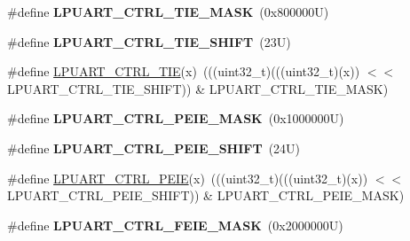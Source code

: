 \begin{DoxyCompactItemize}
\item 
\mbox{\label{group___l_p_u_a_r_t___register___masks_gac83549268480aabbbe8450d1f3986090}} 
\#define {\bfseries L\+P\+U\+A\+R\+T\+\_\+\+C\+T\+R\+L\+\_\+\+T\+I\+E\+\_\+\+M\+A\+SK}~(0x800000\+U)
\item 
\mbox{\label{group___l_p_u_a_r_t___register___masks_gab5a90d5ebd146e3cc70bcff71f23d8cc}} 
\#define {\bfseries L\+P\+U\+A\+R\+T\+\_\+\+C\+T\+R\+L\+\_\+\+T\+I\+E\+\_\+\+S\+H\+I\+FT}~(23\+U)
\item 
\#define \mbox{\hyperlink{group___l_p_u_a_r_t___register___masks_ga5b4e1b65b7d7dd995742fdf22b9a53a5}{L\+P\+U\+A\+R\+T\+\_\+\+C\+T\+R\+L\+\_\+\+T\+IE}}(x)~(((uint32\+\_\+t)(((uint32\+\_\+t)(x)) $<$$<$ L\+P\+U\+A\+R\+T\+\_\+\+C\+T\+R\+L\+\_\+\+T\+I\+E\+\_\+\+S\+H\+I\+FT)) \& L\+P\+U\+A\+R\+T\+\_\+\+C\+T\+R\+L\+\_\+\+T\+I\+E\+\_\+\+M\+A\+SK)
\item 
\mbox{\label{group___l_p_u_a_r_t___register___masks_ga84668ad4215b30ebeef6a75c5ea395c6}} 
\#define {\bfseries L\+P\+U\+A\+R\+T\+\_\+\+C\+T\+R\+L\+\_\+\+P\+E\+I\+E\+\_\+\+M\+A\+SK}~(0x1000000\+U)
\item 
\mbox{\label{group___l_p_u_a_r_t___register___masks_gaabdf0695fa68f806e867926d801e1e63}} 
\#define {\bfseries L\+P\+U\+A\+R\+T\+\_\+\+C\+T\+R\+L\+\_\+\+P\+E\+I\+E\+\_\+\+S\+H\+I\+FT}~(24\+U)
\item 
\#define \mbox{\hyperlink{group___l_p_u_a_r_t___register___masks_ga2d374273d0b411f213736b9d43e9f2c5}{L\+P\+U\+A\+R\+T\+\_\+\+C\+T\+R\+L\+\_\+\+P\+E\+IE}}(x)~(((uint32\+\_\+t)(((uint32\+\_\+t)(x)) $<$$<$ L\+P\+U\+A\+R\+T\+\_\+\+C\+T\+R\+L\+\_\+\+P\+E\+I\+E\+\_\+\+S\+H\+I\+FT)) \& L\+P\+U\+A\+R\+T\+\_\+\+C\+T\+R\+L\+\_\+\+P\+E\+I\+E\+\_\+\+M\+A\+SK)
\item 
\mbox{\label{group___l_p_u_a_r_t___register___masks_ga598a03022c0e9a34086e9205f8abea03}} 
\#define {\bfseries L\+P\+U\+A\+R\+T\+\_\+\+C\+T\+R\+L\+\_\+\+F\+E\+I\+E\+\_\+\+M\+A\+SK}~(0x2000000\+U)
\item 
\mbox{\label{group___l_p_u_a_r_t___register___masks_ga812b3faf7150141aa2cda50c95ad00f4}} 

\end{DoxyCompactItemize}
